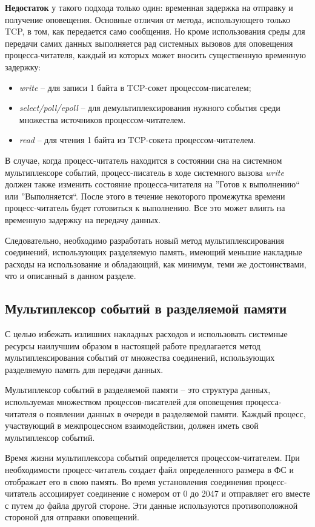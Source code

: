 \textbf{Недостаток} у такого подхода только один: временная задержка на отправку и получение оповещения. Основные отличия от метода, использующего только TCP, в том, как передается само сообщения. Но кроме использования среды для передачи самих данных выполняется рад системных вызовов для оповещения процесса-читателя, каждый из которых может вносить существенную временную задержку:
\begin{itemize}
\item \textit{write} -- для записи 1 байта в TCP-сокет процессом-писателем;
\item \textit{select/poll/epoll} -- для демультиплексирования нужного события среди множества источников процессом-читателем.
\item \textit{read} -- для чтения 1 байта из TCP-сокета процессом-читателем.
\end{itemize}

В случае, когда процесс-читатель находится в состоянии сна на системном мультиплексоре событий, процесс-писатель в ходе системного вызова \textit{write} должен также изменить состояние процесса-читателя на ''Готов к выполнению`` или ''Выполняется``. После этого в течение некоторого промежутка времени процесс-читатель будет готовиться к выполнению. Все это может влиять на временную задержку на передачу данных.

Следовательно, необходимо разработать новый метод мультиплексирования соединений, использующих разделяемую память, имеющий меньшие накладные расходы на использование и обладающий, как минимум, теми же достоинствами, что и описанный в данном разделе. 

\subsection{Мультиплексор событий в разделяемой памяти}\label{chapter31:Mux}

С целью избежать излишних накладных расходов и использовать системные ресурсы наилучшим образом в настоящей работе предлагается метод мультиплексирования событий от множества соединений, использующих разделяемую память для передачи данных.

Мультиплексор событий в разделяемой памяти -- это структура данных, используемая множеством процессов-писателей для оповещения процесса-читателя о появлении данных в очереди в разделяемой памяти. Каждый процесс, участвующий в межпроцессном взаимодействии, должен иметь свой мультиплексор событий.

Время жизни мультиплексора событий определяется процессом-читателем. При необходимости процесс-читатель создает файл определенного размера в ФС и отображает его в свою память. Во время установления соединения процесс-читатель ассоциирует соединение с номером от 0 до 2047 и отправляет его вместе с путем до файла другой стороне. Эти данные используются противоположной стороной для отправки оповещений.

